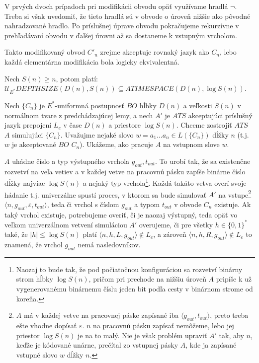 {\begin{dokaz}
  V prvých dvoch prípadoch pri modifikácii obvodu opäť využívame
  hradlá $\neg$. Treba si však uvedomiť, že tieto hradlá sú v obvode
  o úroveň nižšie ako pôvodné nahradzované hradlo. Po príslušnej
  úprave obvodu pokračujeme rekurzívne v prehľadávaní obvodu v
  ďalšej úrovni až sa dostaneme k vstupným vrcholom.

  Takto modifikovaný obvod $C'_n$ zrejme akceptuje rovnaký jazyk ako
  $C_n$, lebo každá elementárna modifikácia bola logicky
  ekvivalentná.
\end{dokaz}

\begin{veta}
  Nech $S(n)\geq n$, potom platí:
  \\ $\mathcal{U}_{E^*}DEPTHSIZE(D(n),S(n))\subseteq
  ATIMESPACE(D(n),\log S(n))$.
\end{veta}

\begin{dokaz}
  Nech $\{ C_n\}$ je $E^*$-uniformná postupnosť $BO$ hĺbky $D(n)$ a
  veľkosti $S(n)$ v normálnom tvare z predchádzajúcej lemy, a nech
  $A'$ je $ATS$ akceptujúci príslušný jazyk prepojení $L_e$ v čase
  $D(n)$ a priestore $\log S(n)$. Chceme zostrojiť $ATS$ $A$
  simulujúci $\{ C_n\}$. Uvažujme nejaké slovo $w=a_1\dots a_n\in
  L(\{ C_n\})$ dĺžky $n$ (t.j. $w$ je akceptované $BO$ $C_n$).
  Ukážeme, ako pracuje $A$ na vstupnom slove $w$.

  $A$ uhádne číslo a typ výstupného vrchola $g_{out},t_{out}$. To
  urobí tak, že sa existenčne rozvetví na veľa vetiev a v každej
  vetve na pracovnú pásku zapíše binárne číslo dĺžky najviac $\log
  S(n)$ a nejaký typ vrchola\footnote{Naozaj to bude tak, že pod
  počiatočnou konfiguráciou sa rozvetví binárny strom hĺbky $\log
  S(n)$, pričom pri prechode na nižšiu úroveň $A$ pripíše k už
  vygenerovanému binárnemu číslu jeden bit podľa cesty v binárnom
  strome od koreňa.}. Každá takáto vetva overí svoje hádanie t.j.
  univerzálne spustí proces, v ktorom sa bude simulovať $A'$ na
  vstupe\footnote{$A$ má v každej vetve na pracovnej páske zapísané
  iba $\langle g_{out},t_{out}\rangle $, preto treba ešte vhodne
  dopísať $\varepsilon$. $n$ na pracovnú pásku zapísať nemôžeme,
  lebo jej priestor $\log S(n)$ je na to malý. Nie je však problém
  upraviť $A'$ tak, aby $n$, keďže je kódované unárne, prečítal zo
  vstupnej pásky $A$, kde ja zapísané vstupné slovo $w$ dĺžky $n$.}
  $\langle n,g_{out},\varepsilon,t_{out}\rangle $, teda či vrchol s
  číslom $g_{out}$ a typom $t_{out}$ v obvode $C_n$ existuje. Ak
  taký vrchol existuje, potrebujeme overiť, či je naozaj výstupný,
  teda opäť vo veľkom univerzálnom vetvení simuláciou $A'$
  overujeme, či pre všetky $h\in\{ 0,1\}^*$ také, že $|h|\leq\log
  S(n)$ platí $\langle n,h,L,g_{out}\rangle \not\in L_e$, a zároveň
  $\langle n,h,R,g_{out}\rangle \not\in L_e$ to znamená, že vrchol
  $g_{out}$ nemá nasledovníkov.


\end{dokaz}}
